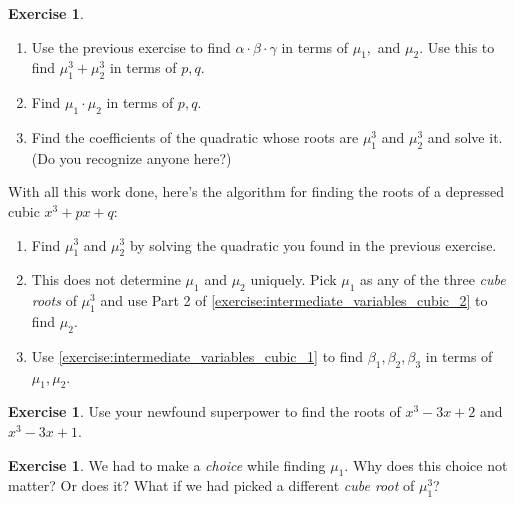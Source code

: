 \documentclass[reqno, 12pt, letter]{article}
\theoremstyle{plain}
\theoremstyle{definition}
\newtheorem{exercise}[theorem]{Exercise}
\theoremstyle{remark}
\numberwithin{equation}{section}
\newcommand{\hint}[1]{\footnote{{Hint:} #1\hfill}}
\let\footnote=\endnote
\begin{document}
	\begin{exercise}
		\label{exercise:intermediate_variables_cubic_2}
		$ $ 
		\begin{enumerate}
			\item Use the previous exercise to find $\alpha \cdot \beta \cdot \gamma$ in terms of $ \mu_1,$ and $\mu_2$. 
				Use this to find $ \mu_1^3 + \mu_2^3$ in terms of $ p, q$.
\hint{First expand $\alpha, \beta$.}
			\item Find $ \mu_1 \cdot \mu_2$ in terms of $ p,q$.
			\item Find the coefficients of the quadratic whose roots are $ \mu_1^3$ and $ \mu_2^3$ and solve it. (Do you recognize anyone  here?)
		\end{enumerate}
	\end{exercise}
	
	\begin{mdframed}
		With all this work done, here's the algorithm for finding the roots of a depressed cubic $ x^3 + px + q$:
		\begin{enumerate}
			\item Find $ \mu_1^3$ and $ \mu_2^3$ by solving the quadratic you found in the previous exercise. 
			\item This does not determine $ \mu_1$ and $ \mu_2$ uniquely. Pick $ \mu_1$ as any of the three \emph{cube roots} of $ \mu_1^3$ and use Part 2 of \autoref{exercise:intermediate_variables_cubic_2} to find $ \mu_2$.
			\item Use \autoref{exercise:intermediate_variables_cubic_1} to find $ \beta_1, \beta_2, \beta_3$ in terms of $ \mu_1, \mu_2$. 
		\end{enumerate}
	\end{mdframed}
		\begin{exercise}
			Use your newfound superpower to find the roots of $x^3 - 3x + 2$ and $x^3 - 3x + 1$.
		\end{exercise}
		
	\begin{exercise}
		We had to make a \emph{choice} while finding $ \mu_1$. Why does this choice not matter? Or does it? What if we had picked a different \emph{cube root} of $ \mu_1^3$?
	\end{exercise}
	
\end{document}
